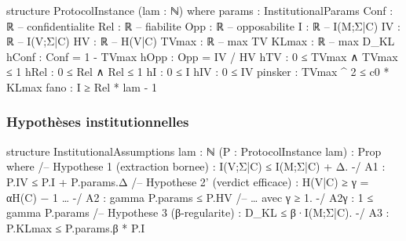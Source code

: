 \begin{sloppypar}
\begin{leancode}[caption={Structure ProtocolInstance pour un $\lambda$ donn\'e}, label={lst:lean4_protocol_instance_complete}]
structure ProtocolInstance (lam : ℕ) where
  params : InstitutionalParams
  Conf   : ℝ   -- confidentialite
  Rel    : ℝ   -- fiabilite
  Opp    : ℝ   -- opposabilite
  I      : ℝ   -- I(M;Σ|C)
  IV     : ℝ   -- I(V;Σ|C)
  HV     : ℝ   -- H(V|C)
  TVmax  : ℝ   -- max TV
  KLmax  : ℝ   -- max D_KL
  hConf  : Conf = 1 - TVmax
  hOpp   : Opp = IV / HV
  hTV    : 0 ≤ TVmax ∧ TVmax ≤ 1
  hRel   : 0 ≤ Rel ∧ Rel ≤ 1
  hI     : 0 ≤ I
  hIV    : 0 ≤ IV
  pinsker : TVmax ^ 2 ≤ c0 * KLmax
  fano    : I ≥ Rel * lam - 1
\end{leancode}

\subsubsection{Hypoth\`eses institutionnelles}
\label{subsubsec:axiomes_info_lean4}

\begin{leancode}[caption={Hypoth\`eses institutionnelles en Lean4}, label={lst:lean4_axiomes_extraction}]
structure InstitutionalAssumptions {lam : ℕ} (P : ProtocolInstance lam) : Prop where
  /-- Hypothese 1 (extraction bornee) : I(V;Σ|C) ≤ I(M;Σ|C) + Δ. -/
  A1 : P.IV ≤ P.I + P.params.Δ
  /-- Hypothese 2' (verdict efficace) : H(V|C) ≥ γ = αH(C) − 1 … -/
  A2 : gamma P.params ≤ P.HV
  /-- … avec γ ≥ 1. -/
  A2γ : 1 ≤ gamma P.params
  /-- Hypothese 3 (β-regularite) : D_KL ≤ β·I(M;Σ|C). -/
  A3 : P.KLmax ≤ P.params.β * P.I
\end{leancode}
\end{sloppypar}

